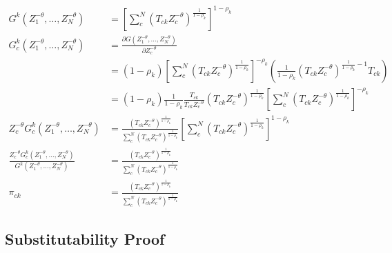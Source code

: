 \documentclass[10pt]{article}
\begin{document}
\begin{align*}
    G^k (Z_1^{-\theta}, \dots, Z_N^{-\theta})                                                                    & =  [\sum_{c}^{N} (T_{ck} Z_c^{-\theta})^{\frac{1}{1 - \rho_k}}]^{1 - \rho_k}                                                                                                                     \\
    G_c^k (Z_1^{-\theta}, \dots, Z_N^{-\theta})                                                                  & = \frac{\partial G(Z_1^{-\theta}, \dots, Z_N^{-\theta})}{\partial Z_c^{-\theta}}                                                                                                                 \\
                                                                                                                 & = (1 - \rho_k)[\sum_{c}^{N} (T_{ck} Z_c^{- \theta})^{\frac{1}{1 - \rho_k}}]^{- \rho_k} (\frac{1}{1 - \rho_k} (T_{ck} Z_c^{- \theta})^{\frac{1}{1 - \rho_k} - 1} T_{ck})                          \\
                                                                                                                 & = (1 - \rho_k) \frac{1}{1 - \rho_k} \frac{T_{ck}}{T_{ck} Z_c^{- \theta}} (T_{ck} Z_c^{- \theta})^{\frac{1}{1 - \rho_k}} [\sum_{c}^{N} (T_{ck} Z_c^{- \theta})^{\frac{1}{1 - \rho_k}}]^{- \rho_k} \\
    Z_c^{- \theta} G_c^k (Z_1^{-\theta}, \dots, Z_N^{-\theta})                                                   & = \frac{(T_{ck} Z_c^{-\theta})^{\frac{1}{1 - \rho_k}}}{\sum_{c}^{N} (T_{ck} Z_c^{-\theta})^{\frac{1}{1 - \rho_k}}} [\sum_{c}^{N} (T_{ck} Z_c^{-\theta})^{\frac{1}{1 - \rho_k}}]^{1 - \rho_k}     \\
    \frac{Z_c^{- \theta} G_c^k (Z_1^{-\theta}, \dots, Z_N^{-\theta})}{G^k (Z_1^{-\theta}, \dots, Z_N^{-\theta})} & = \frac{(T_{ck} Z_c^{-\theta})^{\frac{1}{1 - \rho_k}}}{\sum_{c}^{N} (T_{ck} Z_c^{-\theta})^{\frac{1}{1 - \rho_k}}}                                                                               \\
    \pi_{ck}                                                                                                     & = \frac{(T_{ck} Z_c^{-\theta})^{\frac{1}{1 - \rho_k}}}{\sum_{c}^{N} (T_{ck} Z_c^{-\theta})^{\frac{1}{1 - \rho_k}}}
\end{align*}

\subsection{Substitutability Proof}
\end{document}
